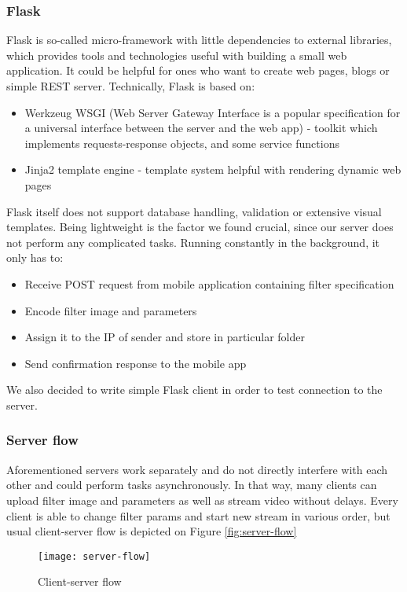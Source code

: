 \documentclass[../Main.tex]{subfiles}
\begin{document}
    \subsubsection{Flask}
    Flask is so-called micro-framework with little dependencies to external libraries, which provides tools and technologies useful with building a small web application. It could be helpful for ones who want to create web pages, blogs or simple REST server. 
    Technically, Flask is based on:
    \begin{itemize}
    \item Werkzeug WSGI (Web Server Gateway Interface is a popular specification for a universal interface between the  server and the web app) - toolkit which implements requests-response objects, and some service functions
    \item Jinja2 template engine - template system helpful with rendering dynamic web pages
    \end{itemize}
    Flask itself does not support database handling, validation or extensive visual templates. Being lightweight is the factor we found crucial, since our server does not perform any complicated tasks. Running constantly in the background, it only has to:
    \begin{itemize}
    \item Receive POST request from mobile application containing filter specification 
    \item Encode filter image and parameters
    \item Assign it to the IP of sender and store in particular folder
    \item Send confirmation response to the mobile app
    \end{itemize}
    We also decided to write simple Flask client in order to test connection to the server.
    
    \subsubsection{Server flow}
    Aforementioned servers work separately and do not directly interfere with each other and could perform tasks asynchronously. In that way, many clients can upload filter image and parameters as well as stream video without delays. Every client is able to change filter params and start new stream in various order, but usual client-server flow is depicted on Figure \ref{fig:server-flow} \\
    \begin{figure}[h]
    \centering
    \texttt{[image: server-flow]}
    \caption{Client-server flow}
    \end{figure}
    
\end{document}
